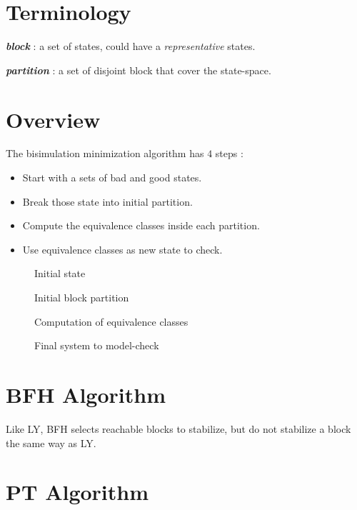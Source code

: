 \documentclass[a4paper,11pt]{article}
\author{Sylvain Julmy}
\newcommand*{\term}[1]{\textbf{\textit{#1}}}
\begin{document}
\section{Terminology}

\term{block} : a set of states, could have a \textit{representative}
states.

\term{partition} : a set of disjoint block that cover the state-space.

\section{Overview}

The bisimulation minimization algorithm has $4$ steps :
\begin{itemize}
\item Start with a sets of bad and good states.
\item Break those state into initial partition.
\item Compute the equivalence classes inside each partition.
\item Use equivalence classes as new state to check.
\end{itemize}

\begin{figure}[h]
  \centering
  \fbox{}
  \caption{Initial state}
  \label{fig:bisimulation_minimization_1}
\end{figure}

\begin{figure}[h]
  \centering
  \fbox{}
  \caption{Initial block partition}
  \label{fig:bisimulation_minimization_2}
\end{figure}

\begin{figure}[h]
  \centering
  \fbox{}
  \caption{Computation of equivalence classes}
  \label{fig:bisimulation_minimization_3}
\end{figure}

\begin{figure}[h]
  \centering
  \fbox{}
  \caption{Final system to model-check}
  \label{fig:bisimulation_minimization_4}
\end{figure}

\section{BFH Algorithm}

Like LY, BFH selects reachable blocks to stabilize, but do not stabilize a block
the same way as LY.

\section{PT Algorithm}
\end{document}
